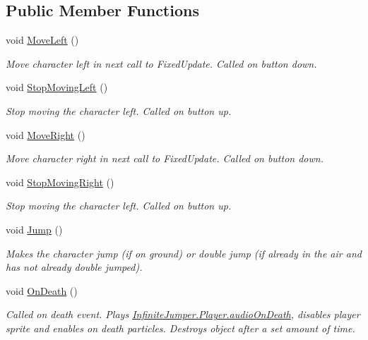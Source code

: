 \subsection*{Public Member Functions}
\begin{DoxyCompactItemize}
\item 
void \hyperlink{class_infinite_jumper_1_1_player_a0b62c5aa1e4ec4e3852aeafbd9e5c906}{Move\+Left} ()
\begin{DoxyCompactList}\small\item\em Move character left in next call to Fixed\+Update. Called on button down. \end{DoxyCompactList}\item 
void \hyperlink{class_infinite_jumper_1_1_player_a5b17789e955258368c6a5eee679cc440}{Stop\+Moving\+Left} ()
\begin{DoxyCompactList}\small\item\em Stop moving the character left. Called on button up. \end{DoxyCompactList}\item 
void \hyperlink{class_infinite_jumper_1_1_player_a55fa450b924a8fafe80034c668268ea6}{Move\+Right} ()
\begin{DoxyCompactList}\small\item\em Move character right in next call to Fixed\+Update. Called on button down. \end{DoxyCompactList}\item 
void \hyperlink{class_infinite_jumper_1_1_player_ad0547385c065e92ce6bcf0301949471d}{Stop\+Moving\+Right} ()
\begin{DoxyCompactList}\small\item\em Stop moving the character left. Called on button up. \end{DoxyCompactList}\item 
void \hyperlink{class_infinite_jumper_1_1_player_acbba53c1279ea421f60fd862fbdd7333}{Jump} ()
\begin{DoxyCompactList}\small\item\em Makes the character jump (if on ground) or double jump (if already in the air and has not already double jumped). \end{DoxyCompactList}\item 
void \hyperlink{class_infinite_jumper_1_1_player_aae3331c165f08acbe739e125c36d2824}{On\+Death} ()
\begin{DoxyCompactList}\small\item\em Called on death event. Plays \hyperlink{class_infinite_jumper_1_1_player_a51f7e100113eb83a93e5d05f3e1ac5b2}{Infinite\+Jumper.\+Player.\+audio\+On\+Death}, disables player sprite and enables on death particles. Destroys object after a set amount of time. \end{DoxyCompactList}\end{DoxyCompactItemize}
